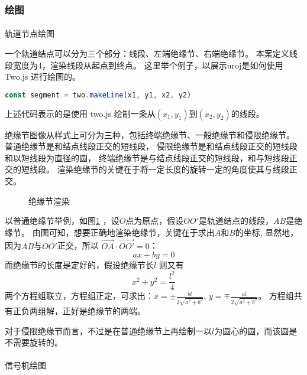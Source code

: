 \subsubsection{绘图}

\paragraph{}轨道节点绘图

一个轨道结点可以分为三个部分：线段、左端绝缘节、右端绝缘节。
本案定义线段宽度为4，渲染线段从起点到终点。
这里举个例子，以展示uroj是如何使用Two.js 进行绘图的。
\begin{lstlisting}[language = JavaScript]
const segment = two.makeLine(x1, y1, x2, y2)
\end{lstlisting}

上述代码表示的是使用 two.js 绘制一条从$(x_1, y_1)$到$(x_2, y_2)$的线段。

绝缘节图像从样式上可分为三种，包括终端绝缘节、一般绝缘节和侵限绝缘节。
普通绝缘节是和结点线段正交的短线段，
侵限绝缘节是和结点线段正交的短线段和以短线段为直径的圆，
终端绝缘节是与结点线段正交的短线段，和与短线段正交的短线段。
渲染绝缘节的关键在于将一定长度的旋转一定的角度使其与线段正交。

\begin{figure}[ht]
    \centering
    
    \caption{\label{node}绝缘节渲染}
\end{figure}

以普通绝缘节举例，如图\ref{node} ，设$O$点为原点，假设$OO'$是轨道结点的线段，$AB$是绝缘节。
由图可知，想要正确地渲染绝缘节，关键在于求出$A$和$B$的坐标,
显然地，因为$AB$与$OO'$正交，所以 $\overrightarrow {OA} \cdot \overrightarrow {OO'} = 0$：
$$ax + by = 0$$
而绝缘节的长度是定好的，假设绝缘节长$l$ 则又有
$$x^2 + y^2 = \frac{l^2}{4}$$
两个方程组联立，方程组正定，可求出：$\displaystyle x = \pm \frac{bl}{2\sqrt{a^2+b^2}}$,
$\displaystyle y = \mp \frac{al}{2\sqrt{a^2+b^2}}$。
方程组共有正负两组解，正好是绝缘节的两端。

对于侵限绝缘节而言，不过是在普通绝缘节上再绘制一以$l$为圆心的圆，而该圆是不需要旋转的。

\paragraph{}信号机绘图

